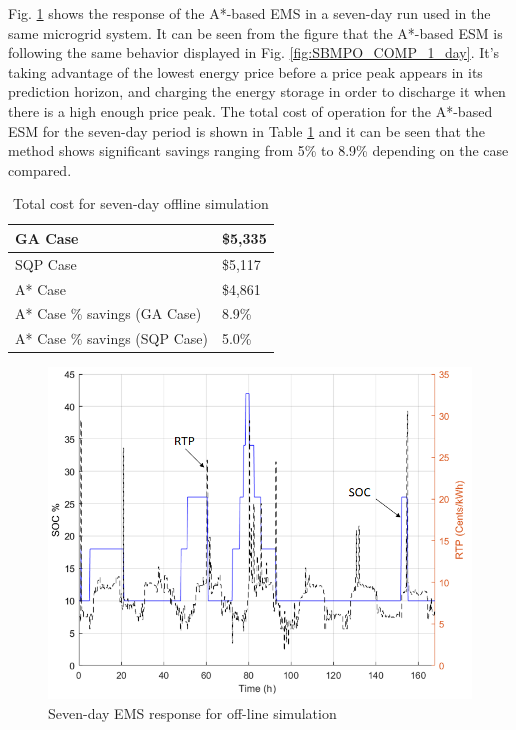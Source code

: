Fig. \ref{fig:SBMPO_COMP_10_12} shows the response of the A*-based EMS in a seven-day run used in the same microgrid system.  It can be seen from the figure that the A*-based ESM is following the same behavior displayed in Fig. \ref{fig:SBMPO_COMP_1_day}. It's taking advantage of the lowest energy price before a price peak appears in its prediction horizon, and charging the energy storage in order to discharge it when there is a high enough price peak. The total cost of operation for the A*-based ESM for the seven-day period is shown in Table \ref{tab:Cost1} and it can be seen that the method shows significant savings ranging from 5\% to 8.9\% depending on the case compared.

\begin{table}[htb]
\caption{Total cost for seven-day offline simulation}
\centering
\label{tab:Cost1}
\begin{tabular}{|l|l|}
\hline
GA Case & \$5,335 \\ \hline
SQP Case & \$5,117 \\ \hline
A* Case & \$4,861 \\ \hline
A* Case \% savings (GA Case) & 8.9\% \\ \hline
A* Case \% savings (SQP Case) & 5.0\% \\ \hline
\end{tabular}
\end{table}

\vspace{-2mm}

\begin{figure}[!ht]
    \centering
    \includegraphics[width = 0.7\linewidth]{figs/SBMPO_COMP_10_12.png}
    \caption{Seven-day EMS response for off-line simulation}
    \label{fig:SBMPO_COMP_10_12}
    \vspace{-5mm}
\end{figure}
